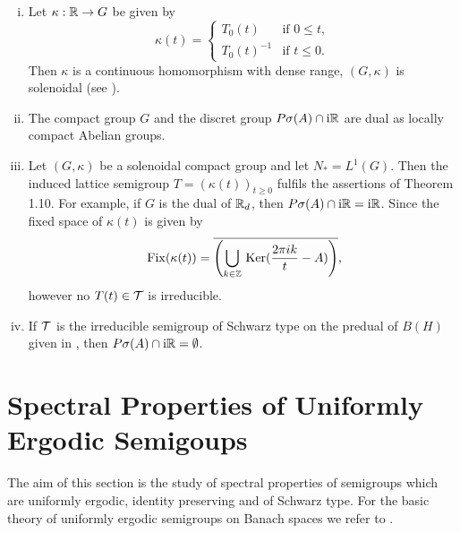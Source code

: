 \begin{remark}\label{rem:d3-1.14}
\begin{enumerate}[(i), wide]
\item Let $\kappa:\mathbb{R} \to G$ be given by
\[
\kappa(t) = \begin{cases}
T_{0}(t) & \text{if } 0 \leq t , \\
T_{0}(t)^{-1} & \text{if } t \leq 0.
\end{cases}
\]
Then $\kappa$ is a continuous homomorphism with dense range, \ie $(G,\kappa)$ is solenoidal (see \citet{hewittross:1963}).

\item 
The compact group $G$ and the discret group $P\sigma(A) \cap \mathrm{i}\mathbb{R}$ are dual as locally compact Abelian groups.

\item 
Let $(G,\kappa)$ be a solenoidal compact group and let $N_{*} = L^{1}(G)$.
Then the induced lattice semigroup $T = (\kappa(t))_{t \geq 0}$ fulfils the assertions of Theorem 1.10.
For example, if $G$ is the dual of $\mathbb{R}_{d}$, then $P\sigma(A) \cap \mathrm{i}\mathbb{R} = \mathrm{i}\mathbb{R}$.
Since the fixed space of $\kappa(t)$ is given by
\[
	\mathop{}\mathrm{Fix}(\kappa(t)) = \overline{ \left(\bigcup_{k \in \mathbb{Z}} \mathop{}\mathrm{Ker}(\frac{2\pi ik}{t} - A)\right) } ,
\]
however no $T(t) \in \mathcal{T}$ is irreducible.

\item 
If $\mathcal{T}$ is the irreducible semigroup of Schwarz type on the predual of $B(H)$ given in \citet{evans:1977}, then $P\sigma(A) \cap \mathrm{i}\mathbb{R} = \emptyset$.
\end{enumerate}
\end{remark}

\section{Spectral Properties of Uniformly Ergodic Semigoups}\label{sec:d3-2}
The aim of this section is the study of spectral properties of semigroups which are uniformly ergodic, identity preserving and of Schwarz type.
For the basic theory of uniformly ergodic semigroups on Banach spaces we refer to \citet{dunfordschwartz:1958}.

